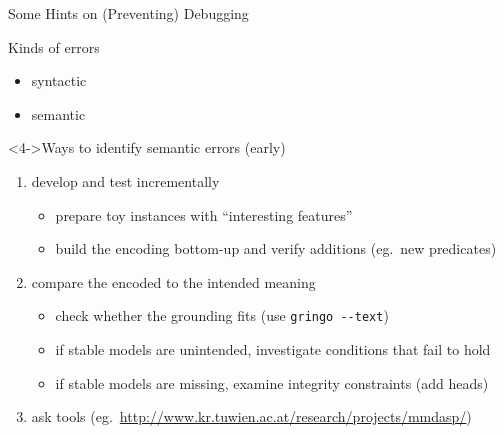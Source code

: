 \begin{frame}{Some Hints on (Preventing) Debugging}
\begin{block}{Kinds of errors}
\vspace*{-2mm}
  \begin{itemize}
  \item \alert<2>{syntactic} \hfill{}
  \item \alert<3->{semantic} \hfill{}
  \end{itemize}
\vspace*{-2mm}
\end{block}
\begin{block}<4->{Ways to identify semantic errors (early)}
  \begin{enumerate}
  \item<4-> \alert{develop and test incrementally}
    \begin{itemize}
    \item prepare toy instances with ``interesting features''
    \item build the encoding bottom-up and verify additions (eg.\ new predicates)
    \end{itemize}
  \item<5-> \alert{compare the encoded to the intended meaning}
    \begin{itemize}
    \item check whether the grounding fits (use \alert{\lstinline{gringo --text}})
    \item if stable models are unintended, investigate conditions that fail to hold
    \item if stable models are missing, examine integrity constraints (add heads)
    \end{itemize}
  \item<6-> ask tools (eg.\ {\footnotesize\url{http://www.kr.tuwien.ac.at/research/projects/mmdasp/}})
  \end{enumerate}
\end{block}
\end{frame}
